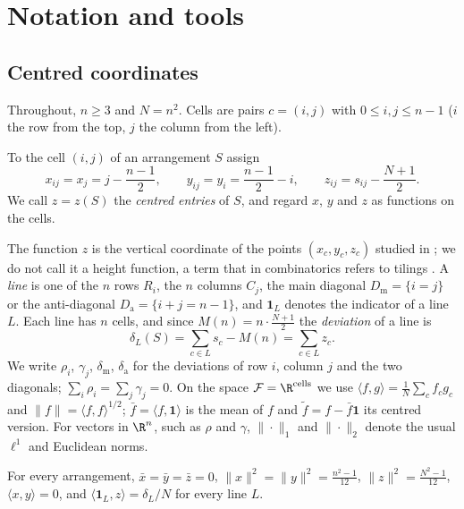 \section{Notation and tools}
\label{sec:background}

\subsection{Centred coordinates}
\label{sec:bg_coords}

Throughout, $n\ge3$ and $N=n^2$.  Cells are pairs $c=(i,j)$ with $0\le i,j\le n-1$ ($i$ the row from the top, $j$ the column from the left).

\begin{definition}
\label{def:coords}
To the cell $(i,j)$ of an arrangement $S$ assign
\begin{equation}
x_{ij}=x_j=j-\frac{n-1}{2},\qquad y_{ij}=y_i=\frac{n-1}{2}-i,\qquad z_{ij}=s_{ij}-\frac{N+1}{2}.
\label{eq:coords}
\end{equation}
We call $z=z(S)$ the \emph{centred entries} of $S$, and regard $x$, $y$ and $z$ as functions on the cells.
\end{definition}

The function $z$ is the vertical coordinate of the points $(x_c,y_c,z_c)$ studied in \cite{mathewson_gems}; we do not call it a height function, a term that in combinatorics refers to tilings \cite{thurston1990conway}.
A \emph{line} is one of the $n$ rows $R_i$, the $n$ columns $C_j$, the main diagonal $D_{\mathrm m}=\{i=j\}$ or the anti-diagonal $D_{\mathrm a}=\{i+j=n-1\}$, and $\mathbf 1_L$ denotes the indicator of a line $L$.
Each line has $n$ cells, and since $M(n)=n\cdot\frac{N+1}2$ the \emph{deviation} of a line is
\begin{equation}
\delta_L(S)=\sum_{c\in L}s_c-M(n)=\sum_{c\in L}z_c .
\label{eq:line_dev}
\end{equation}
We write $\rho_i$, $\gamma_j$, $\delta_{\mathrm m}$, $\delta_{\mathrm a}$ for the deviations of row $i$, column $j$ and the two diagonals; $\sum_i\rho_i=\sum_j\gamma_j=0$.
On the space $\mathcal F=\R^{\text{cells}}$ we use $\langle f,g\rangle=\frac1N\sum_cf_cg_c$ and $\|f\|=\langle f,f\rangle^{1/2}$; $\bar f=\langle f,\mathbf 1\rangle$ is the mean of $f$ and $\tilde f=f-\bar f\mathbf 1$ its centred version.
For vectors in $\R^n$, such as $\rho$ and $\gamma$, $\|\cdot\|_1$ and $\|\cdot\|_2$ denote the usual $\ell^1$ and Euclidean norms.

\begin{lemma}
\label{lem:variances}
For every arrangement, $\bar x=\bar y=\bar z=0$, $\|x\|^2=\|y\|^2=\frac{n^2-1}{12}$, $\|z\|^2=\frac{N^2-1}{12}$, $\langle x,y\rangle=0$, and $\langle\mathbf 1_L,z\rangle=\delta_L/N$ for every line $L$.
\end{lemma}

